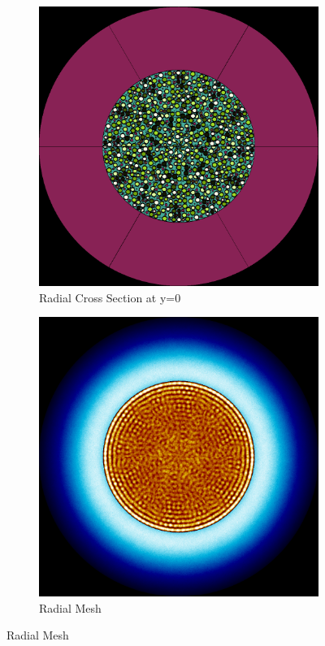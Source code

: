\begin{figure}[H]
\centering

\begin{subfigure}{0.45\textwidth}
  \includegraphics[width=0.95\linewidth]{figures/60-120/60-120-r}
  \caption{Radial Cross Section at y=0}
  \label{fig:60-120-r}
\end{subfigure}%
%
\begin{subfigure}{0.45\textwidth}
  \includegraphics[width=0.95\linewidth]{figures/60-120/60-120-rm}
  \caption{Radial Mesh}
  \label{fig:60-120-rm}
\end{subfigure}


\end{figure}
